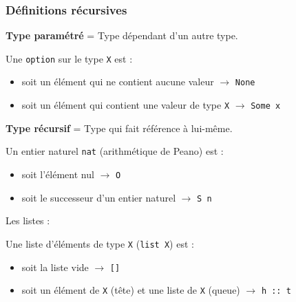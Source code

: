 \documentclass[9pt]{beamer}
\newenvironment{ex}[1][Exemple]{\begin{exampleblock}{#1}}{\end{exampleblock}}
\newcommand{\defi}[1]{\textbf{#1}}
\begin{document}
\begin{frame}
\frametitle{Définitions récursives}

\defi{Type paramétré} = Type dépendant d'un autre type.
\begin{ex}[Une \texttt{option} sur le type \texttt{X} est :]
\begin{itemize}
  \item soit un élément qui ne contient aucune valeur $\rightarrow$ \texttt{None}
  \item soit un élément qui contient une valeur de type \texttt{X} $\rightarrow$ \texttt{Some x}
\end{itemize}
\end{ex}

\pause
\defi{Type récursif} = Type qui fait référence à lui-même.
\begin{ex}[Un entier naturel \texttt{nat} (arithmétique de Peano) est :]
\begin{itemize}
  \item soit l'élément nul $\rightarrow$ \texttt{O}
  \item soit le successeur d'un entier naturel $\rightarrow$ \texttt{S n}
\end{itemize}
\end{ex}

\pause
Les listes :
\begin{ex}[Une liste d'éléments de type \texttt{X} (\texttt{list X}) est :]
\begin{itemize}
  \item soit la liste vide $\rightarrow$ \texttt{[]}
  \item soit un élément de \texttt{X} (tête) et une liste de \texttt{X} (queue) $\rightarrow$ \texttt{h :: t}
\end{itemize}
\end{ex}
\end{frame}
\end{document}

